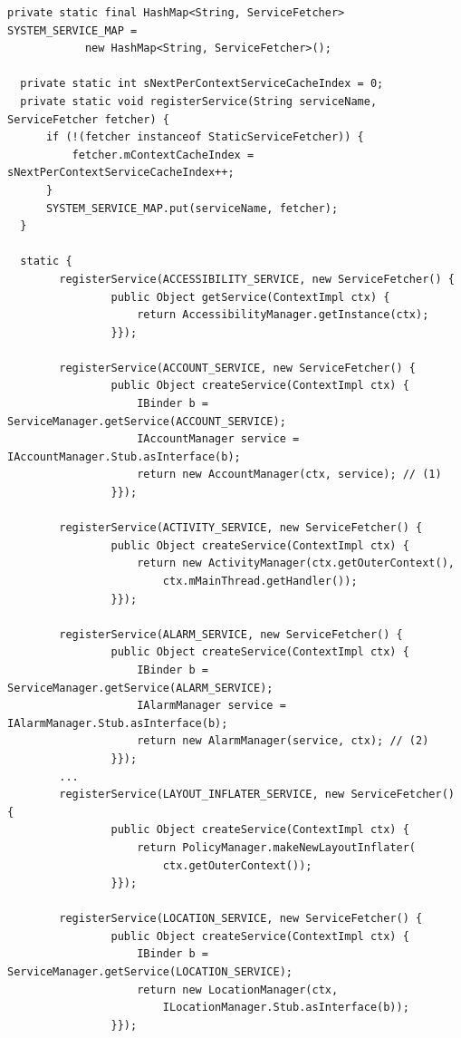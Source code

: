\begin{lstlisting}[frame=single, caption=ContextImpl.java] 
  private static final HashMap<String, ServiceFetcher> SYSTEM_SERVICE_MAP =
            new HashMap<String, ServiceFetcher>();

  private static int sNextPerContextServiceCacheIndex = 0;
  private static void registerService(String serviceName, ServiceFetcher fetcher) {
      if (!(fetcher instanceof StaticServiceFetcher)) {
          fetcher.mContextCacheIndex = sNextPerContextServiceCacheIndex++;
      }
      SYSTEM_SERVICE_MAP.put(serviceName, fetcher);
  }
    
  static {
        registerService(ACCESSIBILITY_SERVICE, new ServiceFetcher() {
                public Object getService(ContextImpl ctx) {
                    return AccessibilityManager.getInstance(ctx);
                }});

        registerService(ACCOUNT_SERVICE, new ServiceFetcher() {
                public Object createService(ContextImpl ctx) {
                    IBinder b = ServiceManager.getService(ACCOUNT_SERVICE);
                    IAccountManager service = IAccountManager.Stub.asInterface(b);
                    return new AccountManager(ctx, service); // (1)
                }});

        registerService(ACTIVITY_SERVICE, new ServiceFetcher() {
                public Object createService(ContextImpl ctx) {
                    return new ActivityManager(ctx.getOuterContext(), 
                    	ctx.mMainThread.getHandler());
                }});

        registerService(ALARM_SERVICE, new ServiceFetcher() {
                public Object createService(ContextImpl ctx) {
                    IBinder b = ServiceManager.getService(ALARM_SERVICE);
                    IAlarmManager service = IAlarmManager.Stub.asInterface(b);
                    return new AlarmManager(service, ctx); // (2)
                }});
		...
        registerService(LAYOUT_INFLATER_SERVICE, new ServiceFetcher() {
                public Object createService(ContextImpl ctx) {
                    return PolicyManager.makeNewLayoutInflater(
                    	ctx.getOuterContext());
                }});

        registerService(LOCATION_SERVICE, new ServiceFetcher() {
                public Object createService(ContextImpl ctx) {
                    IBinder b = ServiceManager.getService(LOCATION_SERVICE);
                    return new LocationManager(ctx, 
                    	ILocationManager.Stub.asInterface(b));
                }});


\end{lstlisting}
